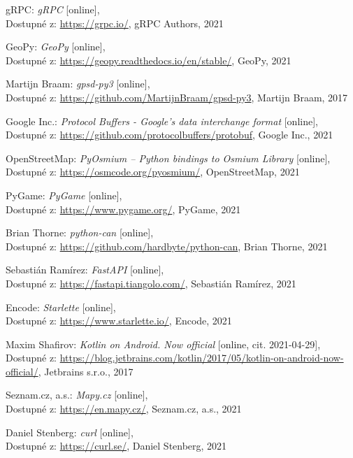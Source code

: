 \documentclass[czech, bachelor]{diploma}
\begin{document}
\begin{thebibliography}{50}
gRPC: \textit{gRPC} [online], \\
Dostupné z:
\url{https://grpc.io/},
gRPC Authors, 2021

GeoPy: \textit{GeoPy} [online], \\
Dostupné z:
\url{https://geopy.readthedocs.io/en/stable/},
GeoPy, 2021

Martijn Braam: \textit{gpsd-py3} [online], \\
Dostupné z:
\url{https://github.com/MartijnBraam/gpsd-py3},
Martijn Braam, 2017

Google Inc.: \textit{Protocol Buffers - Google's data interchange format} [online], \\
Dostupné z:
\url{https://github.com/protocolbuffers/protobuf},
Google Inc., 2021

OpenStreetMap: \textit{PyOsmium -- Python bindings to Osmium Library} [online], \\
Dostupné z:
\url{https://osmcode.org/pyosmium/},
OpenStreetMap, 2021

PyGame: \textit{PyGame} [online], \\
Dostupné z:
\url{https://www.pygame.org/},
PyGame, 2021

Brian Thorne: \textit{python-can} [online], \\
Dostupné z:
\url{https://github.com/hardbyte/python-can},
Brian Thorne, 2021

Sebastián Ramírez: \textit{FastAPI} [online], \\
Dostupné z:
\url{https://fastapi.tiangolo.com/},
Sebastián Ramírez, 2021

Encode: \textit{Starlette} [online], \\
Dostupné z:
\url{https://www.starlette.io/},
Encode, 2021

Maxim Shafirov: \textit{Kotlin on Android. Now official} [online, cit. 2021-04-29], \\
Dostupné z:
\url{https://blog.jetbrains.com/kotlin/2017/05/kotlin-on-android-now-official/},
Jetbrains s.r.o., 2017

Seznam.cz, a.s.: \textit{Mapy.cz} [online], \\
Dostupné z:
\url{https://en.mapy.cz/},
Seznam.cz, a.s., 2021

Daniel Stenberg: \textit{curl} [online], \\
Dostupné z:
\url{https://curl.se/},
Daniel Stenberg, 2021


\end{thebibliography}
\end{document}
